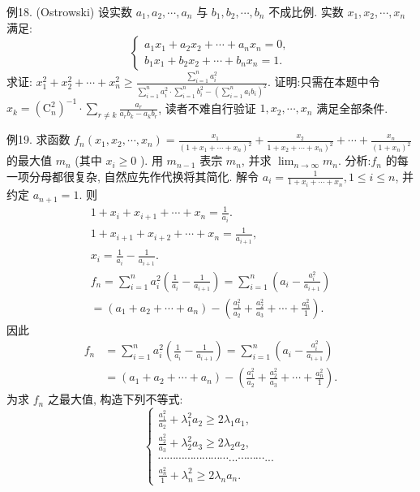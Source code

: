 例18. (Ostrowski) 设实数 $a_1, a_2, \cdots, a_n$ 与 $b_1, b_2, \cdots, b_n$ 不成比例.
实数 $x_1, x_2, \cdots, x_n$ 满足:
$$
\left\{\begin{array}{l}
a_1 x_1+a_2 x_2+\cdots+a_n x_n=0, \\
b_1 x_1+b_2 x_2+\cdots+b_n x_n=1 .
\end{array}\right.
$$
求证: $x_1^2+x_2^2+\cdots+x_n^2 \geqslant \frac{\sum_{i=1}^n a_i^2}{\sum_{i=1}^n a_i^2 \cdot \sum_{i=1}^n b_i^2-\left(\sum_{i=1}^n a_i b_i\right)^2}$.
证明:只需在本题中令 $x_k=\left(\mathrm{C}_n^2\right)^{-1} \cdot \sum_{r \neq k} \frac{a_r}{a_r b_k-a_k b_r}$, 读者不难自行验证 $1, x_2, \cdots, x_n$ 满足全部条件.



例19. 求函数 $f_n\left(x_1, x_2, \cdots, x_n\right)=\frac{x_1}{\left(1+x_1+\cdots+x_n\right)^2}+ \frac{x_2}{\left.1+x_2+\cdots+x_n\right)^2}+\cdots+\frac{x_n}{\left(1+x_n\right)^2}$ 的最大值 $m_n$ (其中 $x_i \geqslant 0$ ). 用 $m_{n-1}$ 表宗 $m_n$, 并求 $\lim _{n \rightarrow \infty} m_n$.
分析:$f_n$ 的每一项分母都很复杂, 自然应先作代换将其简化.
解令 $a_i=\frac{1}{1+x_i+\cdots+x_n}, 1 \leqslant i \leqslant n$, 并约定 $a_{n+1}=1$. 则
$$
\begin{gathered}
1+x_i+x_{i+1}+\cdots+x_n=\frac{1}{a_i} . \\
1+x_{i+1}+x_{i+2}+\cdots+x_n=\frac{1}{a_{i+1}}, \\
x_i=\frac{1}{a_i}-\frac{1}{a_{i+1}} . \\
f_n=\sum_{i=1}^n a_i^2\left(\frac{1}{a_i}-\frac{1}{a_{i+1}}\right)=\sum_{i=1}^n\left(a_i-\frac{a_i^2}{a_{i+1}}\right) \\
=\left(a_1+a_2+\cdots+a_n\right)-\left(\frac{a_1^2}{a_2}+\frac{a_2^2}{a_3}+\cdots+\frac{a_n^2}{1}\right) .
\end{gathered}
$$
因此
$$
\begin{aligned}
f_n & =\sum_{i=1}^n a_i^2\left(\frac{1}{a_i}-\frac{1}{a_{i+1}}\right)=\sum_{i=1}^n\left(a_i-\frac{a_i^2}{a_{i+1}}\right) \\
& =\left(a_1+a_2+\cdots+a_n\right)-\left(\frac{a_1^2}{a_2}+\frac{a_2^2}{a_3}+\cdots+\frac{a_n^2}{1}\right) .
\end{aligned}
$$
为求 $f_n$ 之最大值, 构造下列不等式:
$$
\left\{\begin{array}{l}
\frac{a_1^2}{a_2}+\lambda_1^2 a_2 \geqslant 2 \lambda_1 a_1, \\
\frac{a_2^2}{a_3}+\lambda_2^2 a_3 \geqslant 2 \lambda_2 a_2, \\
\cdots \cdots \cdots \cdots \cdots \cdots \cdots \cdots . . . \cdots \cdots \cdots . . . \\
\frac{a_n^2}{1}+\lambda_n^2 \geqslant 2 \lambda_n a_n .
\end{array}\right. \label{(1)}
$$
